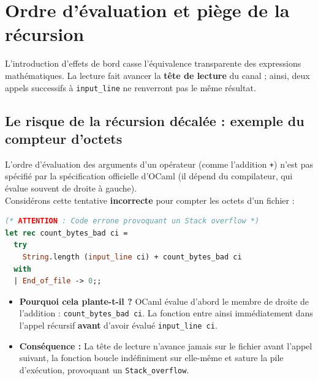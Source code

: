 \documentclass{article}
\begin{document}

\section{Ordre d'évaluation et pi\`ege de la récursion}

L'introduction d'effets de bord casse l'équivalence transparente des expressions mathématiques. La lecture fait avancer la \textbf{tête de lecture} du canal ; ainsi, deux appels successifs à \texttt{input\_line} ne renverront pas le même résultat.

\subsection{Le risque de la récursion décalée : exemple du compteur d'octets}

L'ordre d'évaluation des arguments d'un opérateur (comme l'addition \texttt{+}) n'est pas spécifié par la spécification officielle d'OCaml (il dépend du compilateur, qui évalue souvent de droite à gauche).\\

\noindent Considérons cette tentative \textbf{incorrecte} pour compter les octets d'un fichier :

\begin{lstlisting}[language=Caml]
(* ATTENTION : Code errone provoquant un Stack overflow *)
let rec count_bytes_bad ci =
  try
    String.length (input_line ci) + count_bytes_bad ci
  with
  | End_of_file -> 0;;
\end{lstlisting}

\begin{itemize}
    \item \textbf{Pourquoi cela plante-t-il ?} OCaml évalue d'abord le membre de droite de l'addition : \texttt{count\_bytes\_bad ci}. La fonction entre ainsi immédiatement dans l'appel récursif \textbf{avant} d'avoir évalué \texttt{input\_line ci}. 
    \item \textbf{Conséquence :} La tête de lecture n'avance jamais sur le fichier avant l'appel suivant, la fonction boucle indéfiniment sur elle-même et sature la pile d'exécution, provoquant un \lstinline|Stack_overflow|.
\end{itemize}
\end{document}
